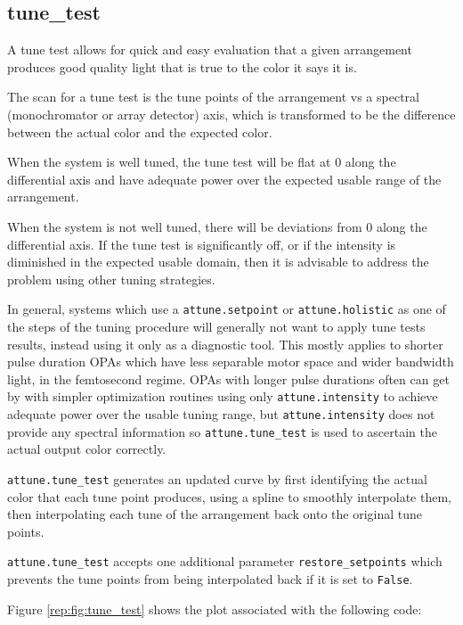\hypertarget{tune_test}{%
\subsection{tune\_test}\label{tune_test}}

A tune test allows for quick and easy evaluation that a given
arrangement produces good quality light that is true to the color it
says it is.

The scan for a tune test is the tune points of the arrangement vs a
spectral (monochromator or array detector) axis, which is transformed to
be the difference between the actual color and the expected color.

When the system is well tuned, the tune test will be flat at 0 along the
differential axis and have adequate power over the expected usable range
of the arrangement.

When the system is not well tuned, there will be deviations from 0 along
the differential axis. If the tune test is significantly off, or if the
intensity is diminished in the expected usable domain, then it is
advisable to address the problem using other tuning strategies.

In general, systems which use a
\texttt{attune.setpoint} or
\texttt{attune.holistic} as one of the steps of the
tuning procedure will generally not want to apply tune tests results,
instead using it only as a diagnostic tool. This mostly applies to
shorter pulse duration OPAs which have less separable motor space and
wider bandwidth light, in the femtosecond regime. OPAs with longer pulse
durations often can get by with simpler optimization routines using only
\texttt{attune.intensity} to achieve adequate power
over the usable tuning range, but
\texttt{attune.intensity} does not provide any spectral
information so \texttt{attune.tune\_test} is used to
ascertain the actual output color correctly.

\texttt{attune.tune\_test} generates an updated curve
by first identifying the actual color that each tune point produces,
using a spline to smoothly interpolate them, then interpolating each
tune of the arrangement back onto the original tune points.

\texttt{attune.tune\_test} accepts one additional
parameter \texttt{restore\_setpoints} which prevents the tune points
from being interpolated back if it is set to \texttt{False}.

Figure \ref{rep:fig:tune_test} shows the plot associated with the following code:

